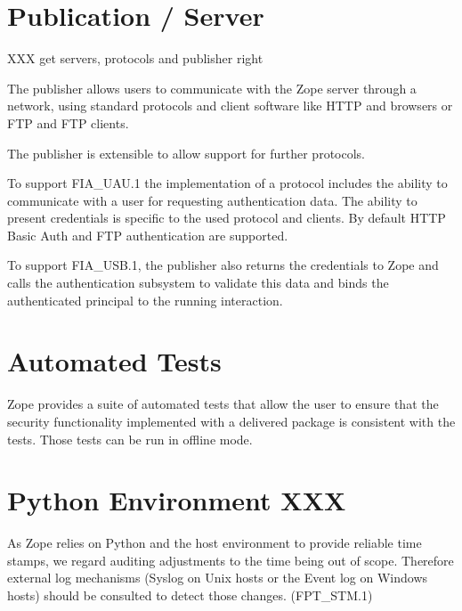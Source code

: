 \documentclass[10pt,a4paper,english]{book}
\begin{document}
\section{Publication / Server}

XXX get servers, protocols and publisher right

The publisher allows users to communicate with the Zope server through a
network, using standard protocols and client software like HTTP and browsers or
FTP and FTP clients.

The publisher is extensible to allow support for further protocols.

To support FIA{\_}UAU.1 the implementation of a protocol includes the ability to
communicate with a user for requesting authentication data. The ability to
present credentials is specific to the used protocol and clients. By default
HTTP Basic Auth and FTP authentication are supported.

To support FIA{\_}USB.1, the publisher also returns the credentials to Zope and
calls the authentication subsystem to validate this data and binds the
authenticated principal to the running interaction.



\hypertarget{automated-tests}{}
\section{Automated Tests}

Zope provides a suite of automated tests that allow the user to ensure that the
security functionality implemented with a delivered package is consistent with
the tests. Those tests can be run in offline mode.



\hypertarget{python-environment-xxx}{}
\section{Python Environment XXX}

As Zope relies on Python and the host environment to provide reliable time
stamps, we regard auditing adjustments to the time being out of scope.
Therefore external log mechanisms (Syslog on Unix hosts or the Event log on
Windows hosts) should be consulted to detect those changes. (FPT{\_}STM.1)
\end{document}
